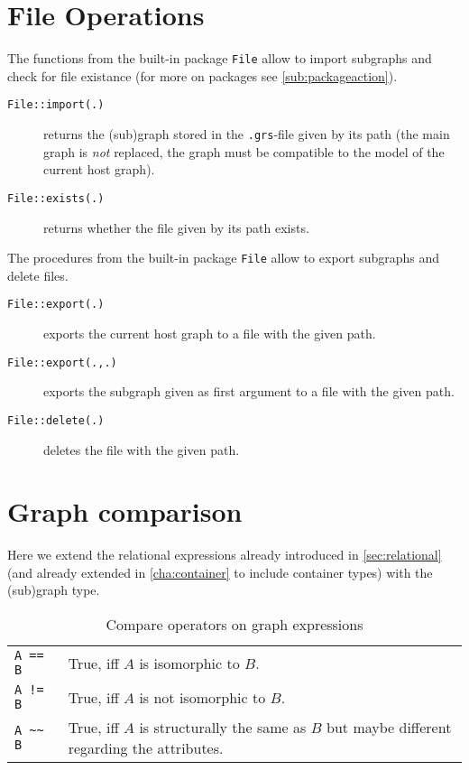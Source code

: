 \section{File Operations}\label{sec:fileop}

The functions from the built-in package \texttt{File} allow to import subgraphs and check for file existance (for more on packages see \ref{sub:packageaction}).

\begin{description}
\item[\texttt{File::import(.)}] returns the (sub)graph stored in the \texttt{.grs}-file given by its path (the main graph is \emph{not} replaced, the graph must be compatible to the model of the current host graph).
\item[\texttt{File::exists(.)}] returns whether the file given by its path exists.
\end{description}

The procedures from the built-in package \texttt{File} allow to export subgraphs and delete files.

\begin{description}
\item[\texttt{File::export(.)}] exports the current host graph to a file with the given path.
\item[\texttt{File::export(.,.)}] exports the subgraph given as first argument to a file with the given path.
\item[\texttt{File::delete(.)}] deletes the file with the given path.
\end{description}


\pagebreak %
\section{Graph comparison}\label{sec:relationalgraph}

Here we extend the relational expressions already introduced in \ref{sec:relational} (and already extended in \ref{cha:container} to include container types) with the (sub)graph type.

\begin{table}[htbp]
  \centering
  \begin{tabularx}{\linewidth}{|l|X|} \hline
    \texttt{A == B} & True, iff $A$ is isomorphic to $B$. \\
    \texttt{A != B} & True, iff $A$ is not isomorphic to $B$. \\
    \texttt{A \textasciitilde\textasciitilde{ } B} & True, iff $A$ is structurally the same as $B$ but maybe different regarding the attributes. \\ \hline
  \end{tabularx}
  \caption{Compare operators on graph expressions}
  \label{compandgraph}
\end{table}

